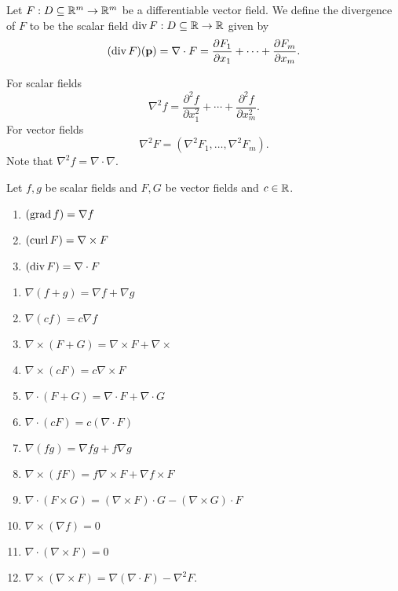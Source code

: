 \documentclass{article}
\begin{document}
\begin{definition}
    Let $F: D \subseteq \mathbb{R}^m \rightarrow \mathbb{R}^m$ be a differentiable vector field.
    We define the divergence of $F$ to be the scalar field $\operatorname{div} F: D \subseteq \mathbb{R} \rightarrow \mathbb{R}$
    given by
    \begin{equation*}
        (\operatorname{div} F)(\mathbf{p}) = \nabla \cdot F = \frac{\partial F_1}{\partial x_1} + \cdots + \frac{\partial F_m}{\partial x_m}.
    \end{equation*}
\end{definition}

\begin{definition}
    For scalar fields
    \begin{equation*}
        \nabla^2 f = \frac{\partial^2 f}{\partial x_1^2} + \cdots + \frac{\partial^2 f}{\partial x_m^2}.
    \end{equation*}
    For vector fields
    \begin{equation*}
        \nabla^2 F = (\nabla^2 F_1, \ldots, \nabla^2 F_m).
    \end{equation*}
    Note that $\nabla^2 f = \nabla \cdot \nabla.$
\end{definition}

\begin{notes}
    Let $f, g$ be scalar fields and $F, G$ be vector fields and $c \in \mathbb{R}$.
    \begin{enumerate}
        \item $(\operatorname{grad} f) = \nabla f$
        \item $(\operatorname{curl} F) = \nabla \times F$
        \item $(\operatorname{div} F) = \nabla \cdot F$
    \end{enumerate}
\end{notes}

\begin{theorem}
    \begin{enumerate}
        \item $\nabla (f + g) = \nabla f + \nabla g$
        \item $\nabla (cf) = c \nabla f$
        \item $\nabla \times (F + G) = \nabla \times F + \nabla \times$
        \item $\nabla \times (cF) = c\nabla \times F$
        \item $\nabla \cdot (F + G) = \nabla \cdot F + \nabla \cdot G$
        \item $\nabla \cdot (cF) = c(\nabla \cdot F)$
        \item $\nabla (fg) = \nabla fg + f\nabla g $
        \item $\nabla \times (fF) = f\nabla \times F + \nabla f \times F$
        \item $\nabla \cdot (F \times G) = (\nabla \times F) \cdot G - (\nabla \times G) \cdot F$
        \item $\nabla \times (\nabla f) = 0$
        \item $\nabla \cdot (\nabla \times F) = 0$
        \item $\nabla \times (\nabla \times F) = \nabla(\nabla \cdot F) - \nabla^2 F.$
    \end{enumerate}
\end{theorem}
\end{document}
